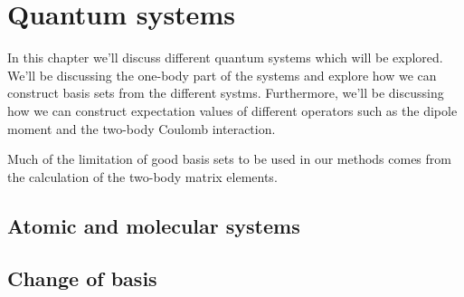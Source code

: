 \chapter{Quantum systems}
    In this chapter we'll discuss different quantum systems which will be
    explored. We'll be discussing the one-body part of the systems and explore
    how we can construct basis sets from the different systms. Furthermore,
    we'll be discussing how we can construct expectation values of different
    operators such as the dipole moment and the two-body Coulomb interaction.

    Much of the limitation of good basis sets to be used in our methods comes
    from the calculation of the two-body matrix elements.

    

    \section{Atomic and molecular systems}

    \section{Change of basis}
        \label{sec:change-of-basis}
